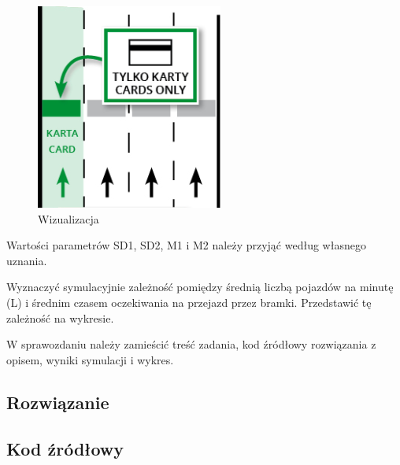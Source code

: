 \documentclass[a4paper,11pt,titlepage]{article}
\begin{document}
\begin{figure}[H]
 \centering
 \includegraphics[width=0.35\columnwidth]{img/tresc.PNG}
 \caption{Wizualizacja}
 \label{fig:wykres1}
\end{figure}

Wartości parametrów SD1, SD2, M1 i M2 należy przyjąć według własnego uznania.

Wyznaczyć symulacyjnie zależność pomiędzy średnią liczbą pojazdów na minutę (L) i średnim czasem oczekiwania na przejazd przez bramki. Przedstawić tę zależność na wykresie.

W sprawozdaniu należy zamieścić treść zadania, kod źródłowy rozwiązania z opisem, wyniki symulacji i wykres.




\subsection{Rozwiązanie}




\subsection{Kod źródłowy}




\end{document}
